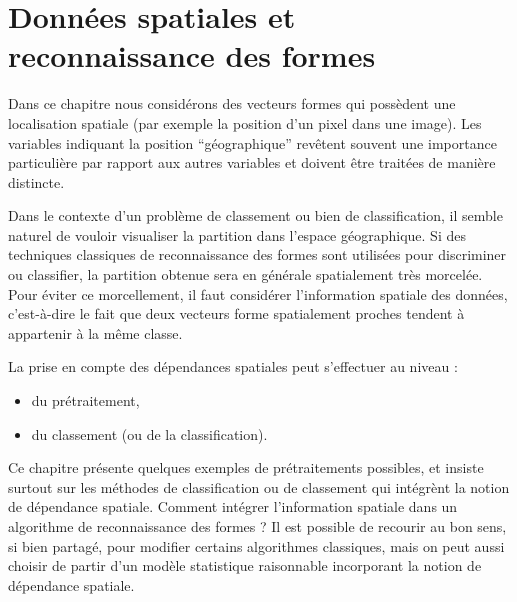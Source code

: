 \chapter{Donn\'ees spatiales et reconnaissance des formes}


Dans ce chapitre nous consid\'erons des vecteurs formes qui poss\`edent
une localisation spatiale (par exemple la position d'un pixel dans une
image). Les variables indiquant la position ``g\'eographique'' rev\^etent souvent
une importance particuli\`ere par rapport aux autres variables et doivent \^etre
trait\'ees de mani\`ere distincte. 

Dans le contexte d'un probl\`eme de classement ou bien  de classification,
il semble naturel de vouloir visualiser la partition dans l'espace g\'eographique.
Si des techniques classiques de reconnaissance des formes sont utilis\'ees pour
discriminer ou classifier, la partition obtenue sera en g\'en\'erale
spatialement tr\`es morcel\'ee. Pour \'eviter ce morcellement, il faut consid\'erer
l'information spatiale des donn\'ees, c'est-\`a-dire le fait que deux 
vecteurs forme spatialement proches tendent \`a appartenir \`a la m\^eme classe.

La prise en compte des d\'ependances spatiales peut s'effectuer au niveau :
\begin{itemize}
\item
du pr\'etraitement,
\item 
du classement (ou de la classification).
\end{itemize}
Ce chapitre pr\'esente quelques exemples de pr\'etraitements possibles, et insiste
surtout sur  les m\'ethodes de classification ou de classement qui int\'egr\`ent
la notion de d\'ependance spatiale. Comment int\'egrer l'information spatiale
dans un algorithme de reconnaissance des formes ? Il est possible 
de recourir au bon sens, si bien partag\'e, pour modifier certains algorithmes classiques, 
mais on peut aussi choisir de partir d'un mod\`ele statistique 
raisonnable incorporant la notion de d\'ependance spatiale. 

